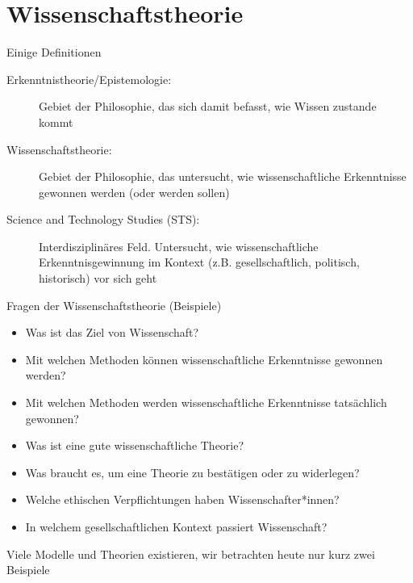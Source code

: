 \documentclass{beamer}
\begin{document}
\section{Wissenschaftstheorie}

\begin{frame}{Einige Definitionen}

\begin{description} 
    \item[Erkenntnistheorie/Epistemologie:] Gebiet der Philosophie, das sich damit befasst, wie Wissen zustande kommt
    \item[Wissenschaftstheorie:] Gebiet der Philosophie, das untersucht, wie wissenschaftliche Erkenntnisse gewonnen werden (oder werden sollen)
    \item[Science and Technology Studies (STS):] Interdisziplinäres Feld. Untersucht, wie wissenschaftliche Erkenntnisgewinnung im Kontext (z.B. gesellschaftlich, politisch, historisch) vor sich geht


\end{description}
    
\end{frame}

\begin{frame}{Fragen der Wissenschaftstheorie (Beispiele)}

\begin{itemize}
    \item Was ist das Ziel von Wissenschaft?
    \item Mit welchen Methoden können wissenschaftliche Erkenntnisse gewonnen werden?
    \item Mit welchen Methoden werden wissenschaftliche Erkenntnisse tatsächlich gewonnen?
    \item Was ist eine gute wissenschaftliche Theorie?
    \item Was braucht es, um eine Theorie zu bestätigen oder zu widerlegen?
    \item Welche ethischen Verpflichtungen haben Wissenschafter*innen?
    \item 
    In welchem gesellschaftlichen Kontext passiert Wissenschaft?
\end{itemize}

Viele Modelle und Theorien existieren, wir betrachten heute nur kurz zwei Beispiele

\end{frame}
\end{document}
